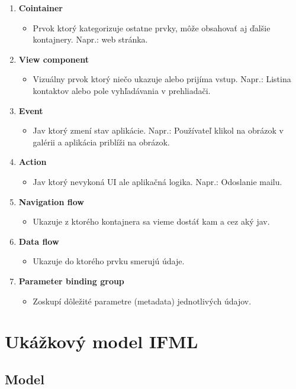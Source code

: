\documentclass[12pt,twoside,slovak,a4paper]{article}
\begin{document}
\begin{enumerate}
	\item \textbf{Cointainer}
	\begin{itemize}
		\item Prvok ktorý kategorizuje ostatne prvky, môže obsahovať aj ďalšie kontajnery. Napr.: web stránka.
	\end{itemize}
	\item \textbf{View component}
	\begin{itemize}
		\item Vizuálny prvok ktorý niečo ukazuje alebo prijíma vstup. Napr.: Listina kontaktov alebo pole vyhľadávania v prehliadači.
	\end{itemize}
	\item \textbf{Event}
	\begin{itemize}
		\item Jav ktorý zmení stav aplikácie. Napr.: Používateľ klikol na obrázok v galérii a aplikácia priblíži na obrázok.
	\end{itemize}
	\item \textbf{Action}
	\begin{itemize}
		\item Jav ktorý nevykoná UI ale aplikačná logika. Napr.: Odoslanie mailu.
	\end{itemize}
	\item \textbf{Navigation flow}
	\begin{itemize}
		\item Ukazuje z ktorého kontajnera sa vieme dostáť kam a cez aký jav.
	\end{itemize}
	\item \textbf{Data flow}
	\begin{itemize}
		\item Ukazuje do ktorého prvku smerujú údaje.
	\end{itemize}
	\item \textbf{Parameter binding group}
	\begin{itemize}
		\item Zoskupí dôležité parametre (metadata) jednotlivých údajov.
	\end{itemize}
\end{enumerate}

\clearpage

\section{Ukážkový model IFML}

\subsection{Model}
\end{document}
